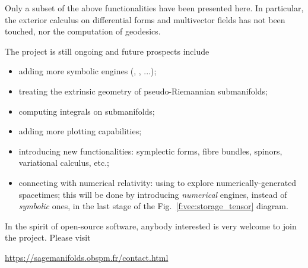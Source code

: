 Only a subset of the above functionalities have been presented here. In particular,
the exterior calculus on differential forms and multivector fields has not been
touched, nor the computation of geodesics.

\medskip

The  project is still ongoing and future prospects include
\begin{itemize}
\item adding more symbolic engines (, , ...);
\item treating the extrinsic geometry of pseudo-Riemannian submanifolds;
\item computing integrals on submanifolds;
\item adding more plotting capabilities;
\item introducing new functionalities: symplectic forms, fibre bundles,
spinors, variational calculus, etc.;
\item connecting with numerical relativity: using \Sage{} to explore
numerically-generated spacetimes; this will be done by introducing
\emph{numerical} engines, instead
of \emph{symbolic} ones, in the last stage of the Fig.~\ref{f:vec:storage_tensor}
diagram.
\end{itemize}
In the spirit of open-source software, anybody interested is very welcome
to join the project. Please visit
\begin{center}
\url{https://sagemanifolds.obspm.fr/contact.html}
\end{center}

